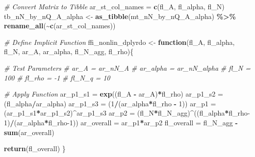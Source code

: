 \documentclass[
]{book}
\newenvironment{Shaded}{\begin{snugshade}}{\end{snugshade}}
\newcommand{\CommentTok}[1]{\textcolor[rgb]{0.56,0.35,0.01}{\textit{#1}}}
\newcommand{\ControlFlowTok}[1]{\textcolor[rgb]{0.13,0.29,0.53}{\textbf{#1}}}
\newcommand{\DecValTok}[1]{\textcolor[rgb]{0.00,0.00,0.81}{#1}}
\newcommand{\KeywordTok}[1]{\textcolor[rgb]{0.13,0.29,0.53}{\textbf{#1}}}
\newcommand{\NormalTok}[1]{#1}
\newcommand{\OperatorTok}[1]{\textcolor[rgb]{0.81,0.36,0.00}{\textbf{#1}}}
\newcommand{\StringTok}[1]{\textcolor[rgb]{0.31,0.60,0.02}{#1}}
\begin{document}
\begin{Shaded}
\begin{Highlighting}[]
\CommentTok{\# Convert Matrix to Tibble}
\NormalTok{ar\_st\_col\_names =}\StringTok{ }\KeywordTok{c}\NormalTok{(}\StringTok{\textquotesingle{}fl\_A\textquotesingle{}}\NormalTok{, }\StringTok{\textquotesingle{}fl\_alpha\textquotesingle{}}\NormalTok{, }\StringTok{\textquotesingle{}fl\_N\textquotesingle{}}\NormalTok{)}
\NormalTok{tb\_nN\_by\_nQ\_A\_alpha \textless{}{-}}\StringTok{ }\KeywordTok{as\_tibble}\NormalTok{(mt\_nN\_by\_nQ\_A\_alpha) }\OperatorTok{\%\textgreater{}\%}\StringTok{ }\KeywordTok{rename\_all}\NormalTok{(}\OperatorTok{\textasciitilde{}}\KeywordTok{c}\NormalTok{(ar\_st\_col\_names))}

\CommentTok{\# Define Implicit Function}
\NormalTok{ffi\_nonlin\_dplyrdo \textless{}{-}}\StringTok{ }\ControlFlowTok{function}\NormalTok{(fl\_A, fl\_alpha, fl\_N, ar\_A, ar\_alpha, fl\_N\_agg, fl\_rho)\{}

  \CommentTok{\# Test Parameters}
  \CommentTok{\# ar\_A = ar\_nN\_A}
  \CommentTok{\# ar\_alpha = ar\_nN\_alpha}
  \CommentTok{\# fl\_N = 100}
  \CommentTok{\# fl\_rho = {-}1}
  \CommentTok{\# fl\_N\_q = 10}

  \CommentTok{\# Apply Function}
\NormalTok{  ar\_p1\_s1 =}\StringTok{ }\KeywordTok{exp}\NormalTok{((fl\_A }\OperatorTok{{-}}\StringTok{ }\NormalTok{ar\_A)}\OperatorTok{*}\NormalTok{fl\_rho)}
\NormalTok{  ar\_p1\_s2 =}\StringTok{ }\NormalTok{(fl\_alpha}\OperatorTok{/}\NormalTok{ar\_alpha)}
\NormalTok{  ar\_p1\_s3 =}\StringTok{ }\NormalTok{(}\DecValTok{1}\OperatorTok{/}\NormalTok{(ar\_alpha}\OperatorTok{*}\NormalTok{fl\_rho }\OperatorTok{{-}}\StringTok{ }\DecValTok{1}\NormalTok{))}
\NormalTok{  ar\_p1 =}\StringTok{ }\NormalTok{(ar\_p1\_s1}\OperatorTok{*}\NormalTok{ar\_p1\_s2)}\OperatorTok{\^{}}\NormalTok{ar\_p1\_s3}
\NormalTok{  ar\_p2 =}\StringTok{ }\NormalTok{(fl\_N}\OperatorTok{*}\NormalTok{fl\_N\_agg)}\OperatorTok{\^{}}\NormalTok{((fl\_alpha}\OperatorTok{*}\NormalTok{fl\_rho}\DecValTok{{-}1}\NormalTok{)}\OperatorTok{/}\NormalTok{(ar\_alpha}\OperatorTok{*}\NormalTok{fl\_rho}\DecValTok{{-}1}\NormalTok{))}
\NormalTok{  ar\_overall =}\StringTok{ }\NormalTok{ar\_p1}\OperatorTok{*}\NormalTok{ar\_p2}
\NormalTok{  fl\_overall =}\StringTok{ }\NormalTok{fl\_N\_agg }\OperatorTok{{-}}\StringTok{ }\KeywordTok{sum}\NormalTok{(ar\_overall)}

  \KeywordTok{return}\NormalTok{(fl\_overall)}
\NormalTok{\}}


\end{Highlighting}
\end{Shaded}
\end{document}
